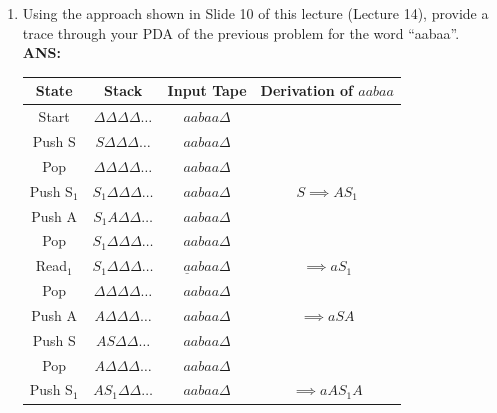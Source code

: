 \documentclass[letterpaper, 12 pt]{article}
\begin{document}
\begin{enumerate}
    \item[21.] Using the approach shown in Slide 10 of this lecture (Lecture
        14), provide a trace through your PDA of the previous problem for the
        word “aabaa”. \\
        \textbf{ANS:} 
        \begin{center}
            \begin{tabular}{| c | c | c | c |}
                \hline
                State      & Stack                                         & Input Tape                                  & Derivation of $aabaa$         \\
                \hline
                Start      & $\Delta \Delta \Delta \Delta \dots          $ & $aabaa               \Delta               $ & \\
                Push S     & $S      \Delta \Delta \Delta \dots          $ & $aabaa               \Delta               $ & \\
                Pop        & $\Delta \Delta \Delta \Delta \dots          $ & $aabaa               \Delta               $ & \\
                Push S$_1$ & $S_1    \Delta \Delta \Delta \dots          $ & $aabaa               \Delta               $ & $S          \implies    AS_1$ \\
                Push A     & $S_1    A      \Delta \Delta \dots          $ & $aabaa               \Delta               $ & \\
                Pop        & $S_1    \Delta \Delta \Delta \dots          $ & $aabaa               \Delta               $ & \\
                Read$_1$   & $S_1    \Delta \Delta \Delta \dots          $ & $\underline{a}abaa   \Delta               $ & $\implies   aS_1$             \\
                Pop        & $\Delta \Delta \Delta \Delta \dots          $ & $aabaa               \Delta               $ & \\
                Push A     & $A      \Delta \Delta \Delta \dots          $ & $aabaa               \Delta               $ & $\implies   aSA$              \\
                Push S     & $A      S      \Delta \Delta \dots          $ & $aabaa               \Delta               $ & \\
                Pop        & $A      \Delta \Delta \Delta \dots          $ & $aabaa               \Delta               $ & \\
                Push S$_1$ & $A      S_1    \Delta \Delta \dots          $ & $aabaa               \Delta               $ & $\implies   aAS_1A$           \\

\end{tabular}
\end{center}
\end{enumerate}
\end{document}
